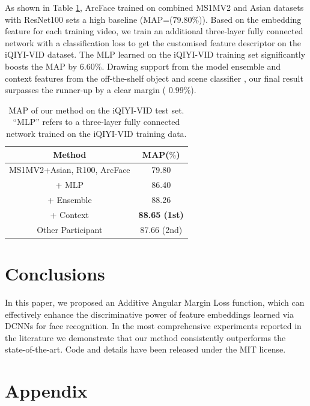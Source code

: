 \documentclass[10pt,twocolumn,letterpaper]{article}
\begin{document}
As shown in Table \ref{table:iqiyivid}, ArcFace trained on combined MS1MV2 and Asian datasets with ResNet100 sets a high baseline (MAP=($79.80\%$)). Based on the embedding feature for each training video, we train an additional three-layer fully connected network with a classification loss to get the customised feature descriptor on the iQIYI-VID dataset. The MLP learned on the iQIYI-VID training set significantly boosts the MAP by $6.60\%$. Drawing support from the model ensemble and context features from the off-the-shelf object and scene classifier \cite{mxnetmodels}, our final result surpasses the runner-up by a clear margin ( $0.99\%$). 

\begin{table}[t!]
\begin{center}
\begin{tabular}{c|c}
\hline
Method                 & MAP($\%$) \\
\hline
MS1MV2+Asian, R100, ArcFace &  79.80    \\
+ MLP                  &  86.40    \\
+ Ensemble             &  88.26    \\
+ Context     &  {\bf 88.65 (1st)} \\
\hline
Other Participant       & 87.66 (2nd) \\
\hline
\end{tabular}
\end{center}
\vspace{-2mm}
\caption{MAP of our method on the iQIYI-VID test set. ``MLP'' refers to a three-layer fully connected network trained on the iQIYI-VID training data. }
\label{table:iqiyivid}
\vspace{-6mm}
\end{table}

\section{Conclusions}

In this paper, we proposed an Additive Angular Margin Loss function, which can effectively enhance the discriminative power of feature embeddings learned via DCNNs for face recognition. In the most comprehensive experiments reported in the literature we demonstrate that our method consistently outperforms the state-of-the-art. Code and details have been released under the MIT license.

\section{Appendix}
\end{document}

